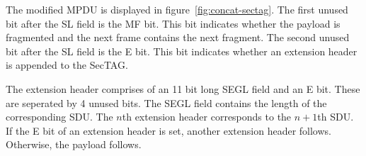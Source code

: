 The modified \gls{MPDU} is displayed in figure~\ref{fig:concat-sectag}.
The first unused bit after the \acrlong{SL} field is the \gls{MF} bit.
This bit indicates whether the payload is fragmented and the next frame contains the next fragment.
The second unused bit after the \acrlong{SL} field is the \gls{E} bit.
This bit indicates whether an extension header is appended to the \gls{SecTAG}.

The extension header comprises of an 11 bit long \acrfull{SEGL} field and an \gls{E} bit.
These are seperated by 4 unused bits.
The \gls{SEGL} field contains the length of the corresponding \gls{SDU}.
The $n$th extension header corresponds to the $n + 1$th \gls{SDU}.
If the \gls{E} bit of an extension header is set, another extension header follows.
Otherwise, the payload follows.
